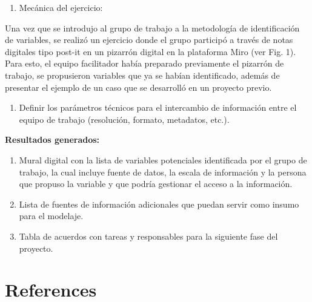 \documentclass[
  letterpaper,
  DIV=11,
  numbers=noendperiod]{scrreprt}
\providecommand{\tightlist}{%
  \setlength{\itemsep}{0pt}\setlength{\parskip}{0pt}}\usepackage{longtable,booktabs,array}
\newlength{\cslhangindent}
\newenvironment{CSLReferences}[2] %
 {\begin{list}{}{%
  \setlength{\itemindent}{0pt}
  \setlength{\leftmargin}{0pt}
  \setlength{\parsep}{0pt}
  \ifodd #1
   \setlength{\leftmargin}{\cslhangindent}
   \setlength{\itemindent}{-1\cslhangindent}
  \fi
  \setlength{\itemsep}{#2\baselineskip}}}
 {\end{list}}
\begin{document}
\begin{enumerate}
\def\labelenumi{\alph{enumi})}
\tightlist
\item
  Mecánica del ejercicio:
\end{enumerate}

Una vez que se introdujo al grupo de trabajo a la metodología de
identificación de variables, se realizó un ejercicio donde el grupo
participó a través de notas digitales tipo post-it en un pizarrón
digital en la plataforma Miro (ver Fig. 1). Para esto, el equipo
facilitador había preparado previamente el pizarrón de trabajo, se
propusieron variables que ya se habían identificado, además de presentar
el ejemplo de un caso que se desarrolló en un proyecto previo.

\begin{enumerate}
\def\labelenumi{\arabic{enumi}.}
\setcounter{enumi}{3}
\tightlist
\item
  Definir los parámetros técnicos para el intercambio de información
  entre el equipo de trabajo (resolución, formato, metadatos, etc.).
\end{enumerate}

\textbf{Resultados generados:}

\begin{enumerate}
\def\labelenumi{\arabic{enumi}.}
\item
  Mural digital con la lista de variables potenciales identificada por
  el grupo de trabajo, la cual incluye fuente de datos, la escala de
  información y la persona que propuso la variable y que podría
  gestionar el acceso a la información.
\item
  Lista de fuentes de información adicionales que puedan servir como
  insumo para el modelaje.
\item
  Tabla de acuerdos con tareas y responsables para la siguiente fase del
  proyecto.
\end{enumerate}


\chapter*{References}\label{references}


\label{refs}
\begin{CSLReferences}{0}{1}
\end{CSLReferences}
\end{document}
